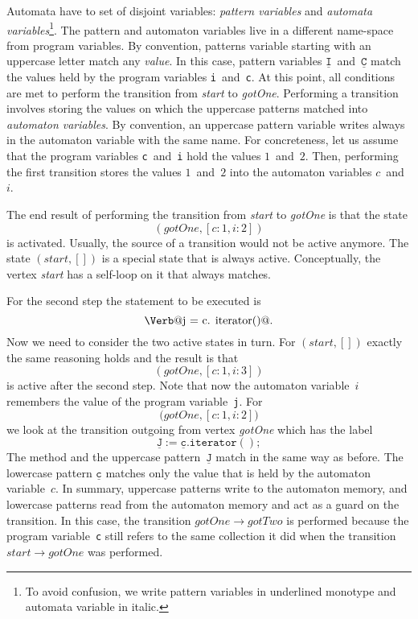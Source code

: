 \documentclass[preprint]{sigplanconf} %
\makeatletter
\newcommand{\verbline}[2][]{\[\text{\Verb@#2@}#1\]}
\newcommand{\pattern}[1]{\mathtt{\underline{#1}}}
\theoremstyle{definition}
\theoremstyle{remark}
\makeatother
\begin{document}
Automata have to set of disjoint variables: {\em pattern variables} and {\em automata variables}\footnote{To avoid confusion, we write pattern variables in underlined monotype and automata variable in italic.}.
The pattern and automaton variables live in a different name-space from program variables.
By convention, patterns variable starting with an uppercase letter match any \emph{value}.
In this case, pattern variables $\pattern{I}$~and~$\pattern{C}$ match the values held by the program variables {\tt i}~and~{\tt c}.
At this point, all conditions are met to perform the transition from \textit{start} to \textit{gotOne}.
Performing a transition involves storing the values on which the uppercase patterns matched into {\em automaton variables}.
By convention, an uppercase pattern variable writes always in the automaton variable with the same name. 
For concreteness, let us assume that the program variables {\tt c}~and~{\tt i} hold the values $1$~and~$2$.
Then, performing the first transition stores the values $1$~and~$2$ into the automaton variables $c$~and~$i$.

The end result of performing the transition from \textit{start} to \textit{gotOne} is that the state \[(\mathit{gotOne},[c:1,i:2])\] is activated.
Usually, the source of a transition would not be active anymore.
The state $(\mathit{start},[])$ is a special state that is always active.
Conceptually, the vertex \textit{start} has a self-loop on it that always matches.

For the second step the statement to be executed is \verbline[.]{j = c.\PY{n+na}{iterator}()} 
Now we need to consider the two active states in turn.
For $(\mathit{start},[])$ exactly the same reasoning holds and the result is that \[(\mathit{gotOne},[c:1,i:3])\] is active after the second step.
Note that now the automaton variable~$i$ remembers the value of the program variable~{\tt j}.
For \[\mathit{(gotOne},[c:1,i:2])\] we look at the transition outgoing from vertex \textit{gotOne} which has the label \[\pattern{J}:=\pattern{c}.\mathtt{iterator}();\]
The method and the uppercase pattern~$\pattern J$ match in the same way as before.
The lowercase pattern $\pattern c$ matches only the value that is held by the automaton variable~$c$.
In summary, uppercase patterns write to the automaton memory, and lowercase patterns read from the automaton memory and act as a guard on the transition.
In this case, the transition $\mathit{gotOne}\to\mathit{gotTwo}$ is performed because the program variable~{\tt c} still refers to the same collection it did when the transition $\mathit{start}\to\mathit{gotOne}$ was performed.
\end{document}
